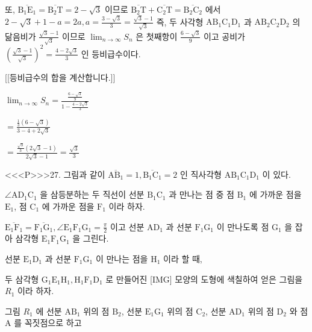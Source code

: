 \documentclass{oblivoir}
\begin{document}
또, $\overline{\mathrm{B}_{1} \mathrm{E}_{1}}=\overline{\mathrm{B}_{2} \mathrm{T}}=2-\sqrt{3}$ 이므로 
$\overline{\mathrm{B}_{2} \mathrm{T}}+\overline{\mathrm{C}_{2} \mathrm{T}}=\overline{\mathrm{B}_{2} \mathrm{C}_{2}}$ 에서 
$2-\sqrt{3}+1-a=2 a, a=\frac{3-\sqrt{3}}{3}=\frac{\sqrt{3}-1}{\sqrt{3}}$ 
즉, 두 사각형 $\mathrm{AB}_{1} \mathrm{C}_{1} \mathrm{D}_{1}$ 과 $\mathrm{AB}_{2} \mathrm{C}_{2} \mathrm{D}_{2}$ 의 
닮음비가 $\frac{\sqrt{3}-1}{\sqrt{3}}$ 이므로 $\displaystyle \lim _{n \rightarrow \infty} S_{n}$ 은 
첫째항이 $\frac{6-\sqrt{3}}{9}$ 이고 공비가 $\left(\frac{\sqrt{3}-1}{\sqrt{3}}\right)^{2}=\frac{4-2 \sqrt{3}}{3}$ 인 등비급수이다.

[[등비급수의 합을 계산합니다.]]

$\displaystyle \lim _{n \rightarrow \infty} S_{n}= \frac{\frac{6-\sqrt{3}}{9}}{1-\frac{4-2 \sqrt{3}}{3}} $

$=\frac{\frac{1}{3}(6-\sqrt{3})}{3-4+2 \sqrt{3}}$

$=\frac{\frac{\sqrt{3}}{3}(2 \sqrt{3}-1)}{2 \sqrt{3}-1}=\frac{\sqrt{3}}{3}$

<<<P>>>27. 그림과 같이 $\overline{\mathrm{AB}_{1}}=1, \overline{\mathrm{B}_{1} \mathrm{C}_{1}}=2$ 인 
직사각형 $\mathrm{AB}_{1} \mathrm{C}_{1} \mathrm{D}_{1}$ 이 있다.

$\angle \mathrm{AD}_{1} \mathrm{C}_{1}$ 을 삼등분하는 두 직선이 선분 $\mathrm{B}_{1} \mathrm{C}_{1}$ 과 
만나는 점 중 점 $\mathrm{B}_{1}$ 에 가까운 점을 $\mathrm{E}_{1}$, 점 $\mathrm{C}_{1}$ 에 가까운 점을 $\mathrm{F}_{1}$ 이라 하자.

$\overline{\mathrm{E}_{1} \mathrm{F}_{1}}=\overline{\mathrm{F}_{1} \mathrm{G}_{1}}, \angle \mathrm{E}_{1} \mathrm{F}_{1} \mathrm{G}_{1}=\frac{\pi}{2}$ 이고
선분 $\mathrm{AD}_{1}$ 과 선분 $\mathrm{F}_{1} \mathrm{G}_{1}$ 이 만나도록 점 $\mathrm{G}_{1}$ 을 잡아 
삼각형 $\mathrm{E}_{1} \mathrm{F}_{1} \mathrm{G}_{1}$ 을 그린다.

선분 $\mathrm{E}_{1} \mathrm{D}_{1}$ 과 선분 $\mathrm{F}_{1} \mathrm{G}_{1}$ 이 만나는 점을 $\mathrm{H}_{1}$ 이라 할 때,

두 삼각형 $\mathrm{G}_{1} \mathrm{E}_{1} \mathrm{H}_{1}, \mathrm{H}_{1} \mathrm{F}_{1} \mathrm{D}_{1}$ 로 만들어진 [IMG] 모양의 
도형에 색칠하여 얻은 그림을 $R_{1}$ 이라 하자.

그림 $R_{1}$ 에 선분 $\mathrm{AB}_{1}$ 위의 점 $\mathrm{B}_{2}$, 선분 $\mathrm{E}_{1} \mathrm{G}_{1}$ 위의 점 $\mathrm{C}_{2}$, 
선분 $\mathrm{AD}_{1}$ 위의 점 $\mathrm{D}_{2}$ 와 점 $\mathrm{A}$ 를 꼭짓점으로 하고 
\end{document}
